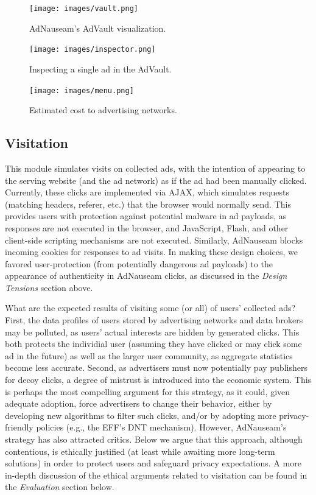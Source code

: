 \documentclass[conference]{IEEEtran}
\begin{document}
\begin{figure}[!t]
\centering
\texttt{[image: images/vault.png]}
\caption{AdNauseam's AdVault visualization.}
\label{fig:vault}
\vspace{10mm}
\texttt{[image: images/inspector.png]}
\caption{Inspecting a single ad in the AdVault.}
\label{fig:inspector}
\vspace{10mm}
\texttt{[image: images/menu.png]}
\caption{Estimated cost to advertising networks.}
\label{fig:menu}
\end{figure}


\subsection{Visitation}

This module simulates visits on collected ads, with the intention of appearing to the serving website (and the ad network) as if the ad had been manually clicked. Currently, these clicks are implemented via AJAX, which simulates requests (matching headers, referer, etc.) that the browser would normally send. This provides users with protection against potential malware in ad payloads, as responses are not executed in the browser, and JavaScript, Flash, and other client-side scripting mechanisms are not executed. Similarly, AdNauseam blocks incoming cookies for responses to ad visits. In making these design choices, we favored user-protection (from potentially dangerous ad payloads) to the appearance of authenticity in AdNauseam clicks, as discussed in the \emph{Design Tensions} section above.

What are the expected results of visiting some (or all) of users' collected ads? First, the data profiles of users stored by advertising networks and data brokers may be polluted, as users' actual interests are hidden by generated clicks. This both protects the individial user (assuming they have clicked or may click some ad in the future) as well as the larger user community, as aggregate statistics become less accurate. Second, as advertisers must now potentially pay publishers for decoy clicks, a degree of mistrust is introduced into the economic system. This is perhaps the most compelling argument for this strategy, as it could, given adequate adoption, force advertisers to change their behavior, either by developing new algorithms to filter such clicks, and/or by adopting more privacy-friendly policies (e.g., the EFF's DNT mechanism). However, AdNauseam's strategy has also attracted critics. Below we argue that this approach, although contentious, is ethically justified (at least while awaiting more long-term solutions) in order to protect users and safeguard privacy expectations. A more in-depth discussion of the ethical arguments related to visitation can be found in the \emph{Evaluation} section below.
\end{document}
